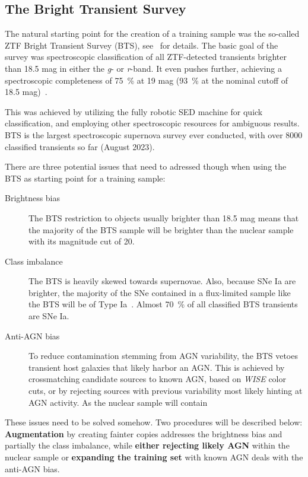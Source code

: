 \subsection{The Bright Transient Survey}\label{bts}
The natural starting point for the creation of a training sample was the so-called ZTF Bright Transient Survey (BTS), see~\cite{Fremling2020,Perley2020} for details. The basic goal of the survey was spectroscopic classification of all ZTF-detected transients brighter than 18.5 mag in either the \textit{g}- or \textit{r}-band. It even pushes further, achieving a spectroscopic completeness of \SI{75}{\percent} at 19 mag (\SI{93}{\percent} at the nominal cutoff of 18.5 mag)~\cite{Perley2020}.

This was achieved by utilizing the fully robotic SED machine for quick classification, and employing other spectroscopic resources for ambiguous results. BTS is the largest spectroscopic supernova survey ever conducted, with over 8000 classified transients so far (August 2023).

There are three potential issues that need to adressed though when using the BTS as starting point for a training sample:

\begin{description}
  \item[Brightness bias] The BTS restriction to objects usually brighter than 18.5 mag means that the majority of the BTS sample will be brighter than the nuclear sample with its magnitude cut of 20.
  \item[Class imbalance] The BTS is heavily skewed towards supernovae. Also, because SNe Ia are brighter, the majority of the SNe contained in a flux-limited sample like the BTS will be of Type Ia~\cite{Perley2020}. Almost \SI{70}{\percent} of all classified BTS transients are SNe Ia.
  \item[Anti-AGN bias] To reduce contamination stemming from AGN variability, the BTS vetoes transient host galaxies that likely harbor an AGN. This is achieved by crossmatching candidate sources to known AGN, based on \textit{WISE} color cuts, or by rejecting sources with previous variability most likely hinting at AGN activity. As the nuclear sample will contain
\end{description}

These issues need to be solved somehow. Two procedures will be described below: \textbf{Augmentation} by creating fainter copies addresses the brightness bias and partially the class imbalance, while \textbf{either rejecting likely AGN} within the nuclear sample or \textbf{expanding the training set} with known AGN deals with the anti-AGN bias.

